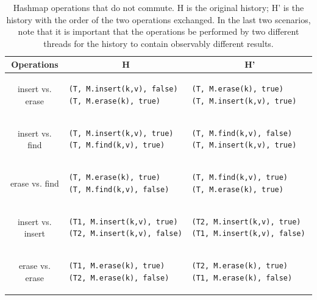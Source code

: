 \begin{table}[t]
    \singlespace
    \centering
    \begin{tabular}{|c|l|l|}
        \hline
        Operations & \multicolumn{1}{c}{H} & \multicolumn{1}{|c|}{H'} \\
        \hline
    
        insert vs. erase &
\begin{lstlisting}
(T, M.insert(k,v), false)                       
(T, M.erase(k), true)
\end{lstlisting} &
\begin{lstlisting}
(T, M.erase(k), true)
(T, M.insert(k,v), true)                       
\end{lstlisting}\\
\hline
    insert vs. find &
\begin{lstlisting}
(T, M.insert(k,v), true)                       
(T, M.find(k,v), true)
\end{lstlisting} &
\begin{lstlisting}
(T, M.find(k,v), false)
(T, M.insert(k,v), true)                       
\end{lstlisting}\\
    \hline
   erase vs. find&
\begin{lstlisting}
(T, M.erase(k), true)                       
(T, M.find(k,v), false)
\end{lstlisting} &
\begin{lstlisting}
(T, M.find(k,v), true)                       
(T, M.erase(k), true)
\end{lstlisting}\\
    \hline
    insert vs. insert &
\begin{lstlisting}
(T1, M.insert(k,v), true)                       
(T2, M.insert(k,v), false)
\end{lstlisting} &
\begin{lstlisting}
(T2, M.insert(k,v), true)
(T1, M.insert(k,v), false)                       
\end{lstlisting}\\
\hline
     erase vs. erase&
\begin{lstlisting}
(T1, M.erase(k), true)                       
(T2, M.erase(k), false)
\end{lstlisting} &
\begin{lstlisting}
(T2, M.erase(k), true)                       
(T1, M.erase(k), false)
\end{lstlisting}\\
\hline    
    \end{tabular}
    \caption[Hashmap operations that do not commute]{Hashmap operations that do not commute. H is the original history; H' is the history with the order of the two operations exchanged. In the last two scenarios, note that it is important that the operations be performed by two different threads for the history to contain observably different results.}
    \label{tab:hm_commute}
    \end{table}

